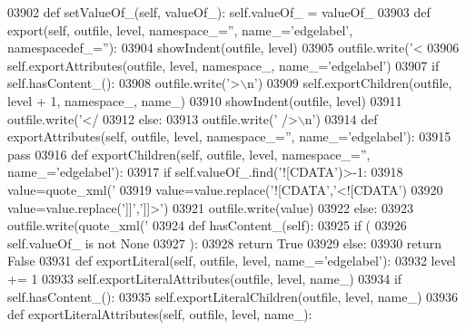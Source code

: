 \begin{DoxyCode}
{{{{{{{{{{{{{{{{{{{{{{{{{{{{{{{{{{{{{{{{{{{{{{{{{{{{{{{{{{{{{{{{{{{{{{{{{{{{{{{{{{{{{{{{{{{{{{{{{{{{{{{{{{{{{{{{{{{{{{{{{{{{{{{{{{{{{{{{{{{{{{{{{{{{{{{{{{{{{{{{{{{{{{{{{{{{{{{{{{{{{{{{{{{{{{{{{{{{{{{{{{{{{{{{{{{{{{{{{{{{{{{{{{{{{{{{{{{{{{{{{{{{{{{{{{{03902     \textcolor{keyword}{def }setValueOf_(self, valueOf\_): self.valueOf\_ = valueOf\_
03903     \textcolor{keyword}{def }export(self, outfile, level, namespace\_='', name\_='edgelabel', namespacedef\_=''):
03904         showIndent(outfile, level)
03905         outfile.write(\textcolor{stringliteral}{'<%
03906         self.exportAttributes(outfile, level, namespace\_, name\_=\textcolor{stringliteral}{'edgelabel'})
03907         \textcolor{keywordflow}{if} self.hasContent_():
03908             outfile.write(\textcolor{stringliteral}{'>\(\backslash\)n'})
03909             self.exportChildren(outfile, level + 1, namespace\_, name\_)
03910             showIndent(outfile, level)
03911             outfile.write(\textcolor{stringliteral}{'</%
03912         \textcolor{keywordflow}{else}:
03913             outfile.write(\textcolor{stringliteral}{' />\(\backslash\)n'})
03914     \textcolor{keyword}{def }exportAttributes(self, outfile, level, namespace\_='', name\_='edgelabel'):
03915         \textcolor{keywordflow}{pass}
03916     \textcolor{keyword}{def }exportChildren(self, outfile, level, namespace\_='', name\_='edgelabel'):
03917         \textcolor{keywordflow}{if} self.valueOf\_.find(\textcolor{stringliteral}{'![CDATA'})>-1:
03918             value=quote_xml(\textcolor{stringliteral}{'%
03919             value=value.replace(\textcolor{stringliteral}{'![CDATA'},\textcolor{stringliteral}{'<![CDATA'})
03920             value=value.replace(\textcolor{stringliteral}{']]'},\textcolor{stringliteral}{']]>'})
03921             outfile.write(value)
03922         \textcolor{keywordflow}{else}:
03923             outfile.write(quote_xml(\textcolor{stringliteral}{'%
03924     \textcolor{keyword}{def }hasContent_(self):
03925         \textcolor{keywordflow}{if} (
03926             self.valueOf_ \textcolor{keywordflow}{is} \textcolor{keywordflow}{not} \textcolor{keywordtype}{None}
03927             ):
03928             \textcolor{keywordflow}{return} \textcolor{keyword}{True}
03929         \textcolor{keywordflow}{else}:
03930             \textcolor{keywordflow}{return} \textcolor{keyword}{False}
03931     \textcolor{keyword}{def }exportLiteral(self, outfile, level, name\_='edgelabel'):
03932         level += 1
03933         self.exportLiteralAttributes(outfile, level, name\_)
03934         \textcolor{keywordflow}{if} self.hasContent_():
03935             self.exportLiteralChildren(outfile, level, name\_)
03936     \textcolor{keyword}{def }exportLiteralAttributes(self, outfile, level, name\_):
}}}}}}}}}}}}}}}}}}}}}}}}}}}}}}}}}}}}}}}}}}}}}}}}}}}}}}}}}}}}}}}}}}}}}}}}}}}}}}}}}}}}}}}}}}}}}}}}}}}}}}}}}}}}}}}}}}}}}}}}}}}}}}}}}}}}}}}}}}}}}}}}}}}}}}}}}}}}}}}}}}}}}}}}}}}}}}}}}}}}}}}}}}}}}}}}}}}}}}}}}}}}}}}}}}}}}}}}}}}}}}}}}}}}}}}}}}}}}}}}}}}}}}}}}}}}}}}
\end{DoxyCode}
